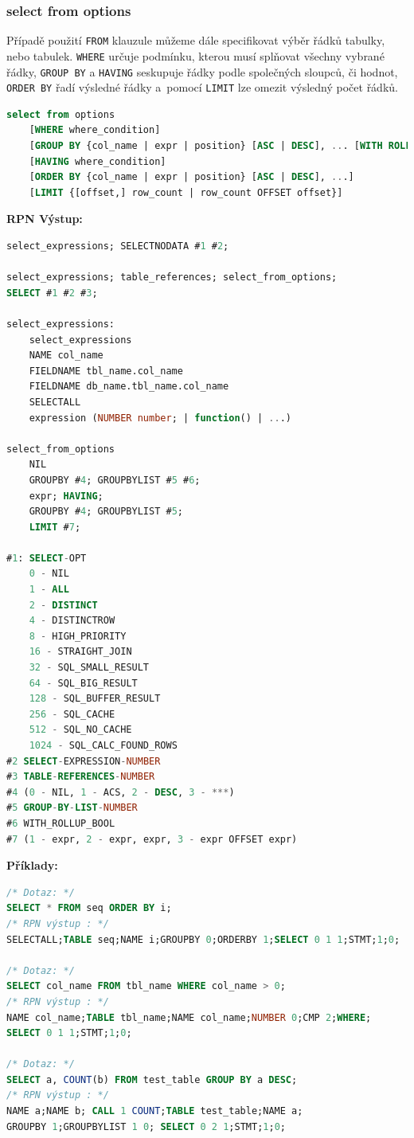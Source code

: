 \subsubsection{select from options} \label{subsubsec:6:selectfromopt}
Případě použití \texttt{FROM} klauzule můžeme dále specifikovat výběr řádků tabulky, nebo tabulek. \texttt{WHERE} určuje podmínku,
kterou musí splňovat všechny vybrané řádky, \texttt{GROUP BY} a \texttt{HAVING} seskupuje řádky podle společných sloupců, či hodnot,
\texttt{ORDER BY} řadí výsledné řádky a~pomocí \texttt{LIMIT} lze omezit výsledný počet řádků.
\begin{lstlisting}[language=sql]
select from options
    [WHERE where_condition]
    [GROUP BY {col_name | expr | position} [ASC | DESC], ... [WITH ROLLUP]]
    [HAVING where_condition]
    [ORDER BY {col_name | expr | position} [ASC | DESC], ...]
    [LIMIT {[offset,] row_count | row_count OFFSET offset}]
\end{lstlisting}

\vspace*{\baselineskip}
\textbf{RPN Výstup:}
\begin{lstlisting}[language=sql]
select_expressions; SELECTNODATA #1 #2;

select_expressions; table_references; select_from_options; 
SELECT #1 #2 #3;

select_expressions:
    select_expressions
    NAME col_name
    FIELDNAME tbl_name.col_name
    FIELDNAME db_name.tbl_name.col_name
    SELECTALL
    expression (NUMBER number; | function() | ...)

select_from_options
    NIL
    GROUPBY #4; GROUPBYLIST #5 #6;
    expr; HAVING;
    GROUPBY #4; GROUPBYLIST #5;
    LIMIT #7;

#1: SELECT-OPT
    0 - NIL
    1 - ALL
    2 - DISTINCT
    4 - DISTINCTROW
    8 - HIGH_PRIORITY
    16 - STRAIGHT_JOIN
    32 - SQL_SMALL_RESULT
    64 - SQL_BIG_RESULT
    128 - SQL_BUFFER_RESULT
    256 - SQL_CACHE
    512 - SQL_NO_CACHE
    1024 - SQL_CALC_FOUND_ROWS
#2 SELECT-EXPRESSION-NUMBER
#3 TABLE-REFERENCES-NUMBER
#4 (0 - NIL, 1 - ACS, 2 - DESC, 3 - ***)
#5 GROUP-BY-LIST-NUMBER
#6 WITH_ROLLUP_BOOL
#7 (1 - expr, 2 - expr, expr, 3 - expr OFFSET expr)
\end{lstlisting}
\vspace*{\baselineskip}
\textbf{Příklady:}
\begin{lstlisting}[language=sql]
/* Dotaz: */
SELECT * FROM seq ORDER BY i;
/* RPN výstup : */
SELECTALL;TABLE seq;NAME i;GROUPBY 0;ORDERBY 1;SELECT 0 1 1;STMT;1;0;

/* Dotaz: */
SELECT col_name FROM tbl_name WHERE col_name > 0;
/* RPN výstup : */
NAME col_name;TABLE tbl_name;NAME col_name;NUMBER 0;CMP 2;WHERE;
SELECT 0 1 1;STMT;1;0;

/* Dotaz: */
SELECT a, COUNT(b) FROM test_table GROUP BY a DESC;
/* RPN výstup : */
NAME a;NAME b; CALL 1 COUNT;TABLE test_table;NAME a;
GROUPBY 1;GROUPBYLIST 1 0; SELECT 0 2 1;STMT;1;0;
\end{lstlisting}

